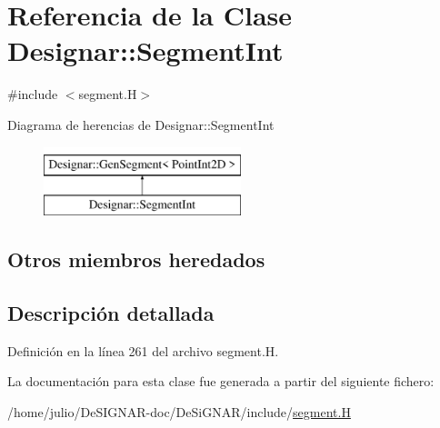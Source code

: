 \hypertarget{class_designar_1_1_segment_int}{}\section{Referencia de la Clase Designar\+:\+:Segment\+Int}
\label{class_designar_1_1_segment_int}


{\ttfamily \#include $<$segment.\+H$>$}

Diagrama de herencias de Designar\+:\+:Segment\+Int\begin{figure}[H]
\begin{center}
\leavevmode
\includegraphics[height=2.000000cm]{class_designar_1_1_segment_int}
\end{center}
\end{figure}
\subsection*{Otros miembros heredados}


\subsection{Descripción detallada}


Definición en la línea 261 del archivo segment.\+H.



La documentación para esta clase fue generada a partir del siguiente fichero\+:\begin{DoxyCompactItemize}
\item 
/home/julio/\+De\+S\+I\+G\+N\+A\+R-\/doc/\+De\+Si\+G\+N\+A\+R/include/\hyperlink{segment_8_h}{segment.\+H}\end{DoxyCompactItemize}
